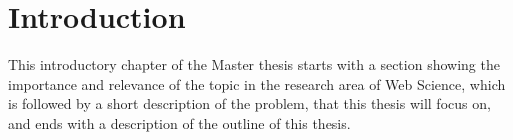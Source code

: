 
\chapter{Introduction} %
\label{cha:introduction}

This introductory chapter of the Master thesis starts with a section showing the importance and relevance of the topic in the research area of Web Science, which is followed by a short description of the problem, that this thesis will focus on, and ends with a description of the outline of this thesis.







